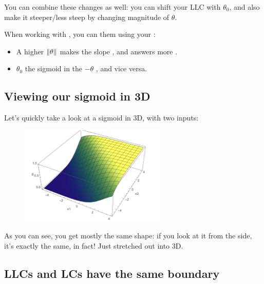         You can combine these changes as well: you can shift your LLC with $\theta_0$, and also make it steeper/less steep by changing magnitude of $\theta$.\\
        
        \begin{concept}
            When working with , you can  them using your :
            
            \begin{itemize}
                \item A higher  $\left\lVert\theta\right\rVert$ makes the slope , and answers more .
                
                \item {} $\theta_0$  the sigmoid in the $-\theta$ , and vice versa.
            \end{itemize}
        \end{concept}
        
    \subsection{Viewing our sigmoid in 3D}
        
        Let's quickly take a look at a sigmoid in 3D, with two inputs:
        
        \begin{figure}[H]
            \centering
            \includegraphics[width=70mm,scale=0.5]{images/classification_images/llc_3d.png}
        \end{figure}
        
        As you can see, you get mostly the same shape: if you look at it from the side, it's exactly the same, in fact! Just stretched out into 3D.
        

        
        
        
        
    \subsection{LLCs and LCs have the same boundary}
        
